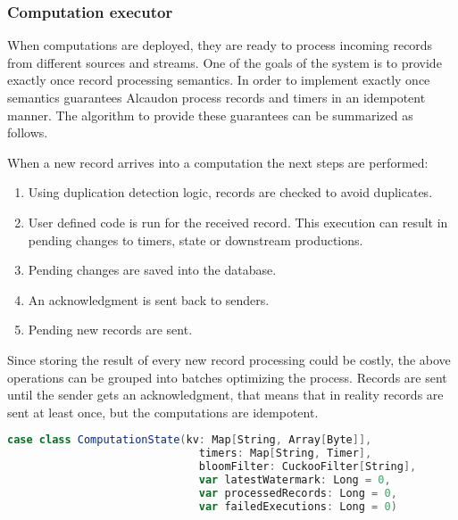 \subsubsection{Computation executor}

When computations are deployed, they are ready to process incoming records from
different sources and streams. One of the goals of the system is to provide
exactly once record processing semantics. In order to implement exactly once
semantics guarantees Alcaudon process records and timers in an idempotent
manner. The algorithm to provide these guarantees can be summarized as follows.

When a new record arrives into a computation the next steps are performed:
\begin{enumerate}
  \item Using duplication detection logic, records are checked to avoid duplicates.
  \item User defined code is run for the received record. This execution can
    result in pending changes to timers, state or downstream productions.
  \item Pending changes are saved into the database.
  \item An acknowledgment is sent back to senders.
  \item Pending new records are sent.
\end{enumerate}

Since storing the result of every new record processing could be costly, the
above operations can be grouped into batches optimizing the process. Records are
sent until the sender gets an acknowledgment, that means that in reality records
are sent at least once, but the computations are idempotent.

\begin{lstlisting}[language=scala, frame=trBL, label=code:computationState, float=ht, caption = {Alcaudon internal computation state}]
case class ComputationState(kv: Map[String, Array[Byte]],
                              timers: Map[String, Timer],
                              bloomFilter: CuckooFilter[String],
                              var latestWatermark: Long = 0,
                              var processedRecords: Long = 0,
                              var failedExecutions: Long = 0)
\end{lstlisting}

